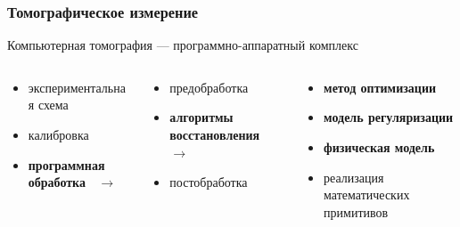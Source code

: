 \begin{frame}
\frametitle{Томографическое измерение}
\end{frame}

\begingroup

\begin{frame}
Компьютерная томография --- программно-аппаратный комплекс
\setlength{\leftmargini}{0em}
\begin{columns}[T,onlytextwidth]
  \begin{column}{.4\textwidth}
  \begin{itemize}
    \item экспериментальная схема
    \item калибровка 
    \item \textbf{программная обработка \ $\rightarrow$}
  \end{itemize}
  \end{column}
  \pause
  \begin{column}[t]{0.4\linewidth}
  \begin{itemize}
    \item предобработка
    \item \textbf{алгоритмы восстановления \ $\rightarrow$}
    \item постобработка
  \end{itemize}
  \end{column}
  \pause
  \begin{column}[t]{0.35\linewidth}
  \begin{itemize}
    \item \textbf{метод оптимизации}
    \item \textbf{модель регуляризации}
    \item \textbf{физическая модель}
    \item реализация математических примитивов
  \end{itemize}
  \end{column}
\end{columns}
\end{frame}
\endgroup

